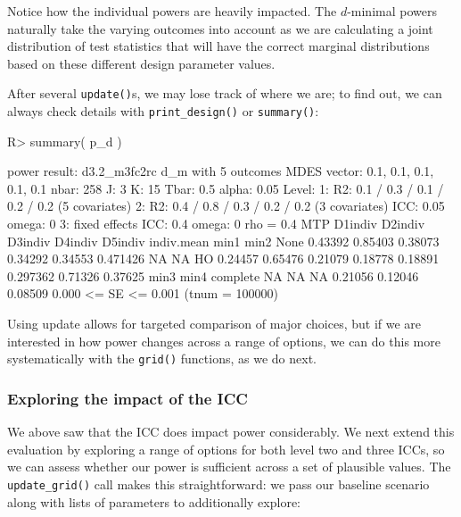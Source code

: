 \documentclass[
]{jss}
\begin{document}
Notice how the individual powers are heavily impacted. The \(d\)-minimal
powers naturally take the varying outcomes into account as we are
calculating a joint distribution of test statistics that will have the
correct marginal distributions based on these different design parameter
values.

After several \texttt{update()}s, we may lose track of where we are; to
find out, we can always check details with \texttt{print\_design()} or
\texttt{summary()}:

\begin{CodeChunk}
\begin{CodeInput}
R> summary( p_d )
\end{CodeInput}
\begin{CodeOutput}
power result: d3.2_m3fc2rc d_m with 5 outcomes
  MDES vector: 0.1, 0.1, 0.1, 0.1, 0.1
  nbar: 258 J: 3    K: 15   Tbar: 0.5
  alpha: 0.05   
  Level:
    1: R2: 0.1 / 0.3 / 0.1 / 0.2 / 0.2 (5 covariates)
    2: R2: 0.4 / 0.8 / 0.3 / 0.2 / 0.2 (3 covariates)   ICC: 0.05   omega: 0
    3:   fixed effects      ICC: 0.4    omega: 0
  rho = 0.4
  MTP D1indiv D2indiv D3indiv D4indiv D5indiv indiv.mean    min1    min2
 None 0.43392 0.85403 0.38073 0.34292 0.34553   0.471426      NA      NA
   HO 0.24457 0.65476 0.21079 0.18778 0.18891   0.297362 0.71326 0.37625
    min3    min4 complete
      NA      NA       NA
 0.21056 0.12046  0.08509
    0.000 <= SE <= 0.001
    (tnum = 100000)
\end{CodeOutput}
\end{CodeChunk}

Using update allows for targeted comparison of major choices, but if we
are interested in how power changes across a range of options, we can do
this more systematically with the \texttt{grid()} functions, as we do
next.

\subsubsection{Exploring the impact of the ICC}

We above saw that the ICC does impact power considerably. We next extend
this evaluation by exploring a range of options for both level two and
three ICCs, so we can assess whether our power is sufficient across a
set of plausible values. The \texttt{update\_grid()} call makes this
straightforward: we pass our baseline scenario along with lists of
parameters to additionally explore:
\end{document}
